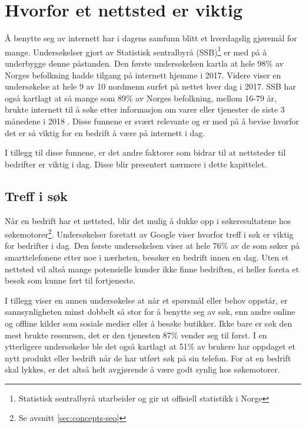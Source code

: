 \section{Hvorfor et nettsted er viktig}
Å benytte seg av internett har i dagens samfunn blitt et hverdagslig gjøremål for mange. Undersøkelser gjort av Statistisk sentralbyrå (SSB)\footnote{Statistisk sentralbyrå utarbeider og gir ut offisiell statistikk i Norge} er med på å underbygge denne påstanden. Den første undersøkelsen \cite{ssb17fim} kartla at hele 98\% av Norges befolkning hadde tilgang på internett hjemme i 2017. Videre viser en undersøkelse \cite{ssb17nat} at hele 9 av 10 nordmenn surfet på nettet hver dag i 2017. SSB har også kartlagt  at så mange som 89\% av Norges befolkning, mellom 16-79 år, brukte internett til å søke etter informasjon om varer eller tjenester de siste 3 månedene i 2018 \cite{ssb18aup}. Disse funnene er svært relevante og er med på å bevise hvorfor det er så viktig for en bedrift å være på internett i dag.

I tillegg til disse funnene, er det andre faktorer som bidrar til at nettsteder til bedrifter er viktig i dag. Disse blir presentert nærmere i dette kapittelet. 

\subsection{Treff i søk}
\label{sec:search-results}
Når en bedrift har et nettsted, blir det mulig å dukke opp i søkeresultatene hos søkemotorer\footnote{Se avsnitt \ref{sec:concepts-seo}}. Undersøkelser foretatt av Google viser hvorfor treff i søk er viktig for bedrifter i dag. Den første undersøkelsen \cite{google16hms} viser at hele 76\% av de som søker på smarttelefonene etter noe i nærheten, besøker en bedrift innen en dag. Uten et nettsted vil altså mange potensielle kunder ikke finne bedriften, ei heller foreta et besøk som kunne ført til fortjeneste. 

I tillegg viser en annen undersøkelse \cite{google16mhc} at når et spørsmål eller behov oppstår, er sannsynligheten minst dobbelt så stor for å benytte seg av søk, enn andre online og offline kilder som sosiale medier eller å besøke butikker. Ikke bare er søk den mest brukte ressursen, det er den tjenesten 87\% vender seg til først. I en ytterligere undersøkelse  \cite{google16scp} ble det også kartlagt at 51\% av brukere har oppdaget et nytt produkt eller bedrift når de har utført søk på sin telefon. For at en bedrift skal lykkes, er det altså helt avgjørende å være godt synlig hos søkemotorer.


